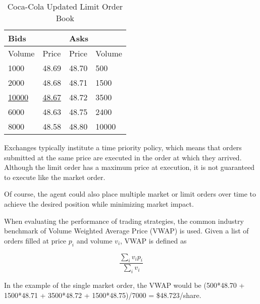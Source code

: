 \begin{table}[htbp]
\caption{Coca-Cola Updated Limit Order Book} \label{tab:coke2}
\begin{center}
\begin{tabular}{ll|ll}
\hline \hline
\multicolumn{2}{l|}{\textbf{Bids}} & \multicolumn{2}{l}{\textbf{Asks}} \\
\hline
Volume           & Price          & Price           & Volume          \\
\hline
1000             & 48.69          & 48.70           & 500             \\
2000             & 48.68          & 48.71           & 1500            \\
\underline{10000}             & \underline{48.67}          & 48.72           & 3500            \\
6000             & 48.63          & 48.75           & 2400            \\
8000             & 48.58          & 48.80           & 10000          
\end{tabular}
\end{center}
\end{table}

Exchanges typically institute a time priority policy, which means that orders submitted at the same price are executed in the order at which they arrived. Although the limit order has a maximum price at execution, it is not guaranteed to execute like the market order. 

Of course, the agent could also place multiple market or limit orders over time to achieve the desired position while minimizing market impact. 

When evaluating the performance of trading strategies, the common industry benchmark of Volume Weighted Average Price (VWAP) is used. Given a list of orders filled at price $p_i$ and volume $v_i$, VWAP is defined as 

$$ \frac{\sum_i{v_i p_i}}{\sum_i{v_i}}$$

In the example of the single market order, the VWAP would be (500*48.70 + 1500*48.71 + 3500*48.72 + 1500*48.75)/7000 = \$48.723/share.

